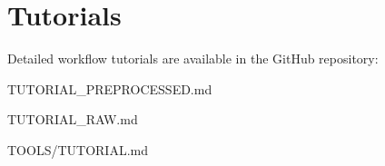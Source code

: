 \chapter{Tutorials}
\hypertarget{tutorials}{}\label{tutorials}
Detailed workflow tutorials are available in the Git\+Hub repository\+:
\begin{DoxyItemize}
\item TUTORIAL\+\_\+\+PREPROCESSED.md
\item TUTORIAL\+\_\+\+RAW.md
\item TOOLS/\+TUTORIAL.md 
\end{DoxyItemize}